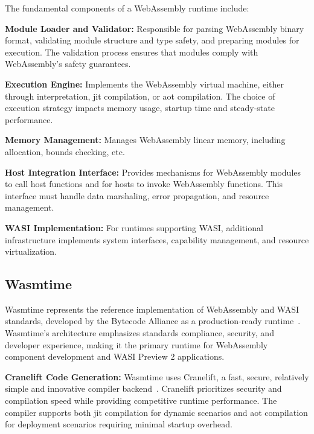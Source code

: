 
The fundamental components of a WebAssembly runtime include:

\textbf{Module Loader and Validator:} Responsible for parsing WebAssembly binary format, validating module structure and type safety, and preparing modules for execution. The validation process ensures that modules comply with WebAssembly's safety guarantees.

\textbf{Execution Engine:} Implements the WebAssembly virtual machine, either through interpretation, \acrfull{jit} compilation, or \acrfull{aot} compilation. The choice of execution strategy impacts memory usage, startup time and steady-state performance.

\textbf{Memory Management:} Manages WebAssembly linear memory, including allocation, bounds checking, etc.

\textbf{Host Integration Interface:} Provides mechanisms for WebAssembly modules to call host functions and for hosts to invoke WebAssembly functions. This interface must handle data marshaling, error propagation, and resource management.

\textbf{WASI Implementation:} For runtimes supporting WASI, additional infrastructure implements system interfaces, capability management, and resource virtualization.

\subsection{Wasmtime}
\label{subsec:wasmtime}

Wasmtime represents the reference implementation of WebAssembly and WASI standards, developed by the Bytecode Alliance as a production-ready runtime~\cite{wasmtime_project}. Wasmtime's architecture emphasizes standards compliance, security, and developer experience, making it the primary runtime for WebAssembly component development and WASI Preview 2 applications.

\textbf{Cranelift Code Generation:} Wasmtime uses Cranelift, a fast, secure, relatively simple and innovative compiler backend~\cite{cranelift}. Cranelift prioritizes security and compilation speed while providing competitive runtime performance. The compiler supports both \acrshort{jit} compilation for dynamic scenarios and \acrshort{aot} compilation for deployment scenarios requiring minimal startup overhead.

